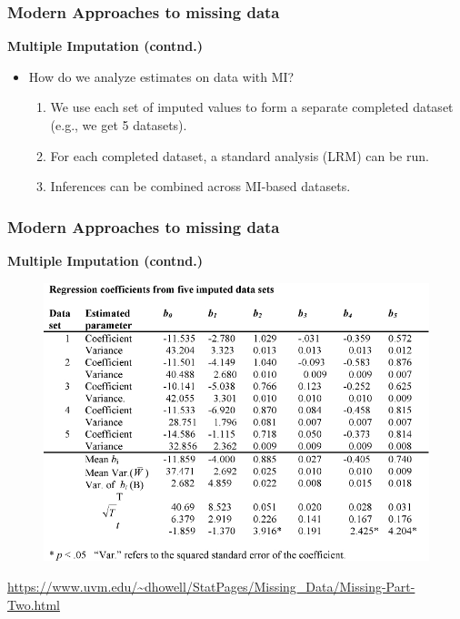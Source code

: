\documentclass{beamer}
\begin{document}


\begin{frame}
\frametitle{Modern Approaches to missing data}
\vspace{0.2cm}
\textbf{Multiple Imputation (contnd.) }
\vspace{0.2cm}
  \begin{itemize}
  \item[] How do we analyze estimates on data with MI?
  \begin{enumerate}
  \vspace{0.5cm}
  \item We use each set of imputed values to form a separate completed dataset (e.g., we get 5 datasets).
  \vspace{0.2cm}
  \item For each completed dataset, a standard analysis (LRM) can be run.
  \vspace{0.2cm}
  \item Inferences can be combined across MI-based datasets.
  \end{enumerate}
 \end{itemize}
 
\end{frame}



\begin{frame}

\frametitle{Modern Approaches to missing data}
\textbf{Multiple Imputation (contnd.) }
\begin{figure}
\includegraphics[width=0.7\linewidth]{IMG/mitable.jpg}
\end{figure}

\scriptsize{\url{https://www.uvm.edu/~dhowell/StatPages/Missing_Data/Missing-Part-Two.html}}

\end{frame}
\end{document}
